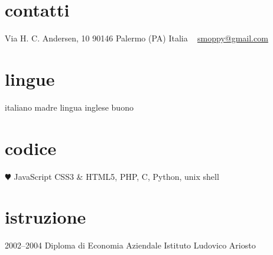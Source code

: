 \documentclass[]{friggeri-cv} %
\begin{document}


\begin{aside} %
\section{contatti}
Via H. C. Andersen, 10
90146 Palermo (PA)
Italia
~
\href{mailto:smoppy@gmail.com}{smoppy@gmail.com}
\section{lingue}
italiano madre lingua
inglese buono
\section{codice}
{\color{red} $\varheartsuit$} JavaScript
CSS3 \& HTML5,
PHP, C, Python, unix shell
\end{aside}

\section{istruzione}
\begin{entrylist}
\entry
{2002--2004}
{Diploma {\normalfont di Economia Aziendale}}
{Istituto Ludovico Ariosto}
{}
\end{entrylist}

\end{document}

